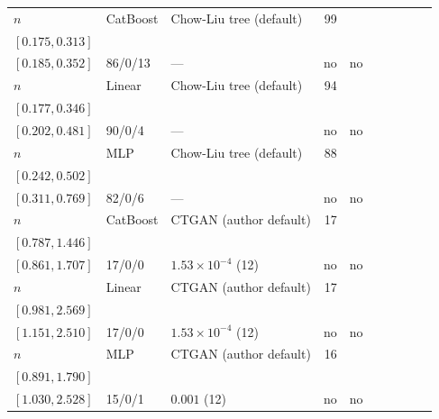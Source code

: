 \begin{longtable}{@{}ll>{\raggedright\arraybackslash}p{1.1in}rllrlll@{}}
$n$ & CatBoost & Chow-Liu tree (default) & 99 & \begin{tabular}[t]{@{}l@{}}$0.239$\\\tiny$[0.175, 0.313]$\end{tabular} & \begin{tabular}[t]{@{}l@{}}$0.261$\\\tiny$[0.185, 0.352]$\end{tabular} & 86/0/13 & --- & no & no \\
$n$ & Linear & Chow-Liu tree (default) & 94 & \begin{tabular}[t]{@{}l@{}}$0.282$\\\tiny$[0.177, 0.346]$\end{tabular} & \begin{tabular}[t]{@{}l@{}}$0.327$\\\tiny$[0.202, 0.481]$\end{tabular} & 90/0/4 & --- & no & no \\
$n$ & MLP & Chow-Liu tree (default) & 88 & \begin{tabular}[t]{@{}l@{}}$0.389$\\\tiny$[0.242, 0.502]$\end{tabular} & \begin{tabular}[t]{@{}l@{}}$0.490$\\\tiny$[0.311, 0.769]$\end{tabular} & 82/0/6 & --- & no & no \\
$n$ & CatBoost & CTGAN (author default) & 17 & \begin{tabular}[t]{@{}l@{}}$1.093$\\\tiny$[0.787, 1.446]$\end{tabular} & \begin{tabular}[t]{@{}l@{}}$1.108$\\\tiny$[0.861, 1.707]$\end{tabular} & 17/0/0 & $1.53\times 10^{-4}$ (12) & no & no \\
$n$ & Linear & CTGAN (author default) & 17 & \begin{tabular}[t]{@{}l@{}}$1.314$\\\tiny$[0.981, 2.569]$\end{tabular} & \begin{tabular}[t]{@{}l@{}}$1.610$\\\tiny$[1.151, 2.510]$\end{tabular} & 17/0/0 & $1.53\times 10^{-4}$ (12) & no & no \\
$n$ & MLP & CTGAN (author default) & 16 & \begin{tabular}[t]{@{}l@{}}$1.314$\\\tiny$[0.891, 1.790]$\end{tabular} & \begin{tabular}[t]{@{}l@{}}$1.378$\\\tiny$[1.030, 2.528]$\end{tabular} & 15/0/1 & $0.001$ (12) & no & no \\

\end{longtable}
